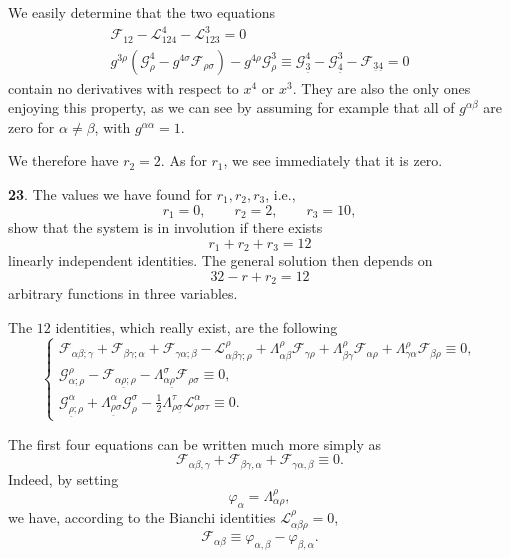 \documentclass[leqno,11pt]{article}
\theoremstyle{shape1}
\theoremstyle{shape0}
\theoremstyle{shape2}
\theoremstyle{definition}
\begin{document}
We easily determine that the two equations
\begin{gather*}
\mathcal{F}_{12}-\mathcal{L}^{4}_{124}-\mathcal{L}^{3}_{123}=0\\
g^{3\rho}(\mathcal{G}^{4}_{\rho}-g^{4\sigma}\mathcal{F}_{\rho\sigma})-g^{4\rho}\mathcal{G}^{3}_{\rho}\equiv\mathcal{G}^{4}_{\underline 3}-\mathcal{G}^{3}_{\underline 4}-\mathcal{F}_{\underline 3\underline 4}=0
\end{gather*}
contain no derivatives with respect to $x^{4}$ or $x^{3}$. They are also the only ones enjoying this property, as we can see by assuming for example that all of $g^{\alpha\beta}$ are zero for $\alpha\neq \beta$, with $g^{\alpha\alpha}=1$.

We therefore have $r_{2}=2$. As for $r_{1}$, we see immediately that it is zero.

\vspace{12pt}

\textbf{23}. The values we have found for $r_{1},r_{2},r_{3}$, i.e.,
\[
r_{1}=0,\qquad r_{2}=2,\qquad r_{3}=10,
\]
show that the system is in involution if there exists
\[
r_{1}+r_{2}+r_{3}=12
\]
linearly independent identities. The general solution then depends on 
\[
32-r+r_{2}=12
\]
arbitrary functions in three variables.

The $12$ identities, which really exist, are the following
\begin{equation}
  \label{eq:V}\tag{V}
  \left\{
    \begin{gathered}
      \mathcal{F}_{\alpha\beta;\gamma}+\mathcal{F}_{\beta\gamma;\alpha}+\mathcal{F}_{\gamma\alpha;\beta}-\mathcal{L}^{\rho}_{\alpha\beta\gamma;\rho}+\Lambda^{\rho}_{\alpha\beta}\mathcal{F}_{\gamma\rho}+\Lambda^{\rho}_{\beta\gamma}\mathcal{F}_{\alpha\rho}+\Lambda^{\rho}_{\gamma\alpha}\mathcal{F}_{\beta\rho}\equiv 0,\\
      \mathcal{G}^{\rho}_{\alpha;\rho}-\mathcal{F}_{\alpha\underline\rho;\rho}-\Lambda^{\sigma}_{\alpha\underline\rho}\mathcal{F}_{\rho\sigma}\equiv 0,\\
      \mathcal{G}^{\alpha}_{\underline\rho;\rho}+\Lambda^{\alpha}_{\underline\rho\sigma}\mathcal{G}^{\sigma}_{\rho}-\frac{1}{2}\Lambda^{\tau}_{\rho\underline\sigma}\mathcal{L}^{\alpha}_{\rho\sigma\tau}\equiv 0.
    \end{gathered}
  \right.
\end{equation}

The first four equations can be written much more simply as
\[
\mathcal{F}_{\alpha\beta,\gamma}+\mathcal{F}_{\beta\gamma,\alpha}+\mathcal{F}_{\gamma\alpha,\beta}\equiv 0.
\]
Indeed, by setting
\[
\varphi_{\alpha}=\Lambda^{\rho}_{\alpha\rho},
\]
we have, according to the Bianchi identities $\mathcal{L}^{\rho}_{\alpha\beta\rho}=0$,
\[
\mathcal{F}_{\alpha\beta}\equiv \varphi_{\alpha,\beta}-\varphi_{\beta,\alpha}.
\]
\end{document}
